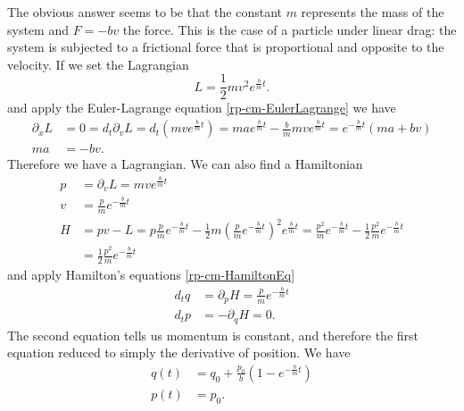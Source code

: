 The obvious answer seems to be that the constant $m$ represents the mass of the system and $F = -bv$ the force. This is the case of a particle under linear drag:  the system is subjected to a frictional force that is proportional and opposite to the velocity. If we set the Lagrangian
\begin{equation}\label{rp-cm-frictionLagrangian}
	L = \frac{1}{2} m v^2 e^{\frac{b}{m}t}.
\end{equation}
and apply the Euler-Lagrange equation \ref{rp-cm-EulerLagrange} we have
\begin{equation}
	\begin{aligned}
	\partial_x L &= 0 = d_t \partial_v L = d_t \left(m v e^{\frac{b}{m}t} \right)=mae^{\frac{b}{m}t} - \frac{b}{m} m v e^{\frac{b}{m}t} = e^{-\frac{b}{m}t}(ma + bv) \\
	ma &= - bv.
	\end{aligned}
\end{equation}
Therefore we have a Lagrangian. We can also find a Hamiltonian
\begin{equation}
	\begin{aligned}
	p &= \partial_v L = m v e^{\frac{b}{m}t} \\
		v &= \frac{p}{m} e^{-\frac{b}{m}t} \\
		H &= p v - L = p \frac{p}{m} e^{-\frac{b}{m}t} - \frac{1}{2} m \left( \frac{p}{m} e^{-\frac{b}{m}t} \right)^2 e^{\frac{b}{m}t} = \frac{p^2}{m}  e^{-\frac{b}{m}t} - \frac{1}{2} \frac{p^2}{m}  e^{-\frac{b}{m}t} \\ 
		&=\frac{1}{2} \frac{p^2}{m}  e^{-\frac{b}{m}t}
	\end{aligned}
\end{equation}
and apply Hamilton's equations \ref{rp-cm-HamiltonEq}
\begin{equation}
	\begin{aligned}
		d_t q &= \partial_p H = \frac{p}{m}  e^{-\frac{b}{m}t} \\
		d_t p &= - \partial_q H = 0. 
	\end{aligned}
\end{equation}
The second equation tells us momentum is constant, and therefore the first equation reduced to simply the derivative of position. We have
\begin{equation}
	\begin{aligned}
	q(t) &= q_0 + \frac{p_0}{b} \left( 1 - e^{-\frac{b}{m}t}\right) \\
	p(t) &= p_0.
	\end{aligned}
\end{equation}


